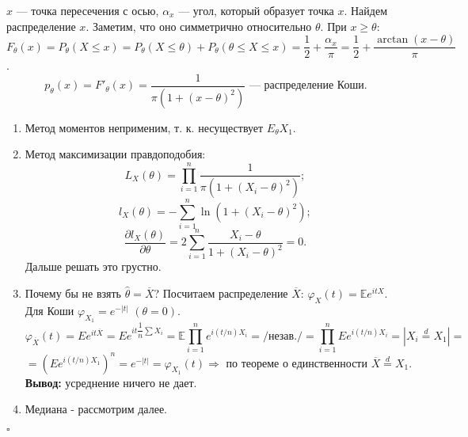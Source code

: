 \documentclass[12pt]{report}
\newenvironment{solution}{{\bfseries Решение:}}{$\square$\\\\}
\theoremstyle{definition}
\begin{document}
\begin{solution}
	$x$ — точка пересечения с осью, $\alpha_x$ — угол, который образует точка $x$. Найдем распределение $x$. Заметим, что оно симметрично относительно $\theta$. При $x \geqslant \theta$: $F_\theta(x) = P_\theta(X \leqslant x) = P_\theta(X \leqslant \theta) + P_\theta(\theta \leqslant X \leqslant x) = \dfrac{1}{2} + \dfrac{\alpha_x}{\pi} = \dfrac{1}{2} + \dfrac{\arctan\left(x - \theta\right)}{\pi}$.
	$$p_\theta(x) = F'_\theta(x) = \dfrac{1}{\pi(1 + (x - \theta)^2)} \text{ — распределение Коши}.$$

	\begin{enumerate}
		\item Метод моментов неприменим, т. к. несуществует $E_\theta X_1$.
		\item Метод максимизации правдоподобия: $$L_X(\theta) = \prod_{i=1}^n \dfrac{1}{\pi(1 + (X_i - \theta)^2)};$$ $$l_X(\theta) = -\sum_{i=1}^n \ln(1 + (X_i - \theta)^2);$$ $$\dfrac{\partial l_X(\theta)}{\partial \theta} = 2\sum_{i = 1}^n \dfrac{X_i - \theta}{1 + (X_i - \theta)^2} = 0.$$ Дальше решать это грустно.
		\item Почему бы не взять $\hat{\theta} = \overline{X}$? Посчитаем распределение $\overline{X}$: $\varphi_X(t) = \mathbb{E} e^{itX}$. Для Коши $\varphi_{X_1} = e^{-|t|}$ $(\theta = 0)$.
		$$\varphi_{\overline{X}} (t) = E e^{it\overline{X}} = Ee^{it\dfrac{1}{n} \sum X_i} = \mathbb{E}\prod_{i=1}^n e^{i(t/n)X_i} = /\text{незав.}/ = \prod_{i=1}^n Ee^{i(t/n)X_i} = |X_i \stackrel{d}{=} X_1| = $$ $$=\left(Ee^{i(t/n)X_1}\right)^n = e^{-|t|} = \varphi_{X_1}(t) \Rightarrow \text{ по теореме о единственности } \overline{X} \stackrel{d}{=} X_1.$$
		\textbf{Вывод:} усреднение ничего не дает.
		\item Медиана - рассмотрим далее.
	\end{enumerate}
\end{solution}
\end{document}
